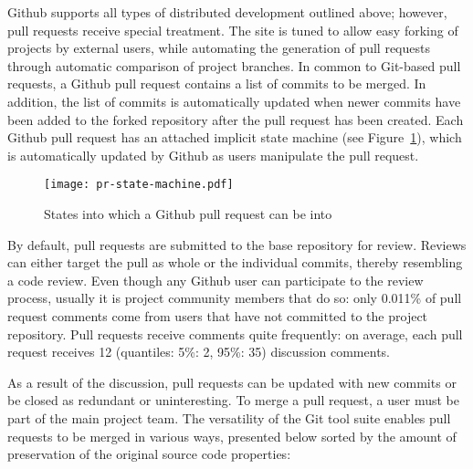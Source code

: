 \documentclass{acm_proc_article-sp}
\begin{document}
Github supports all types of distributed development outlined above; however,
pull requests receive special treatment. The site is tuned to allow easy forking
of projects by external users, while automating the generation of pull
requests through automatic comparison of project branches. In common to
Git-based pull requests, a Github pull request contains a list of commits
to be merged. In addition, the list of commits is automatically updated when newer commits have been added to the forked repository after the pull request
has been created. Each Github pull request has an attached implicit state
machine (see Figure~\ref{fig:state}), which is automatically updated by
Github as users manipulate the pull request.

\begin{figure}
  \begin{center}
    \texttt{[image: pr-state-machine.pdf]}
  \end{center}
  \caption{States into which a Github pull request can be into}
  \label{fig:state}
\end{figure}

By default, pull requests are submitted to the base repository for review.
Reviews can either target the pull as whole or the individual commits,
thereby resembling a code review. 
Even though any Github user can participate to the
review process, usually it is project community members that do so:
only 0.011\% of pull request comments come from users that have not
committed to the project repository.
Pull requests receive comments quite frequently: on average, each pull
request receives 12 (quantiles: 5\%: 2, 95\%: 35) discussion comments.

As a result of the discussion, pull requests can be updated with new commits or
be closed as redundant or uninteresting. To merge a pull request, a user must
be part of the main project team. The versatility of the Git tool suite enables
pull requests to be merged in various ways, presented below sorted by
the amount of preservation of the original source code properties:
\end{document}

